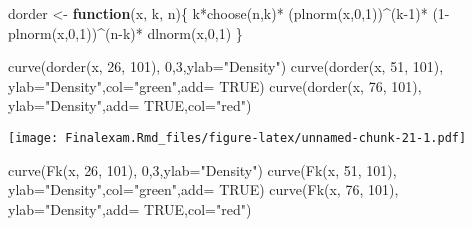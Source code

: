 \documentclass[
]{article}
\newenvironment{Shaded}{\begin{snugshade}}{\end{snugshade}}
\newcommand{\AttributeTok}[1]{\textcolor[rgb]{0.77,0.63,0.00}{#1}}
\newcommand{\ConstantTok}[1]{\textcolor[rgb]{0.00,0.00,0.00}{#1}}
\newcommand{\ControlFlowTok}[1]{\textcolor[rgb]{0.13,0.29,0.53}{\textbf{#1}}}
\newcommand{\DecValTok}[1]{\textcolor[rgb]{0.00,0.00,0.81}{#1}}
\newcommand{\FunctionTok}[1]{\textcolor[rgb]{0.00,0.00,0.00}{#1}}
\newcommand{\NormalTok}[1]{#1}
\newcommand{\OtherTok}[1]{\textcolor[rgb]{0.56,0.35,0.01}{#1}}
\newcommand{\SpecialCharTok}[1]{\textcolor[rgb]{0.00,0.00,0.00}{#1}}
\newcommand{\StringTok}[1]{\textcolor[rgb]{0.31,0.60,0.02}{#1}}
\begin{document}
\begin{Shaded}
\begin{Highlighting}[]
\NormalTok{dorder }\OtherTok{\textless{}{-}} \ControlFlowTok{function}\NormalTok{(x, k, n)\{}
\NormalTok{  k}\SpecialCharTok{*}\FunctionTok{choose}\NormalTok{(n,k)}\SpecialCharTok{*}
\NormalTok{    (}\FunctionTok{plnorm}\NormalTok{(x,}\DecValTok{0}\NormalTok{,}\DecValTok{1}\NormalTok{))}\SpecialCharTok{\^{}}\NormalTok{(k}\DecValTok{{-}1}\NormalTok{)}\SpecialCharTok{*}
\NormalTok{    (}\DecValTok{1}\SpecialCharTok{{-}}\FunctionTok{plnorm}\NormalTok{(x,}\DecValTok{0}\NormalTok{,}\DecValTok{1}\NormalTok{))}\SpecialCharTok{\^{}}\NormalTok{(n}\SpecialCharTok{{-}}\NormalTok{k)}\SpecialCharTok{*}
    \FunctionTok{dlnorm}\NormalTok{(x,}\DecValTok{0}\NormalTok{,}\DecValTok{1}\NormalTok{)}
\NormalTok{\}}

\FunctionTok{curve}\NormalTok{(}\FunctionTok{dorder}\NormalTok{(x, }\DecValTok{26}\NormalTok{, }\DecValTok{101}\NormalTok{), }\DecValTok{0}\NormalTok{,}\DecValTok{3}\NormalTok{,}\AttributeTok{ylab=}\StringTok{"Density"}\NormalTok{)}
\FunctionTok{curve}\NormalTok{(}\FunctionTok{dorder}\NormalTok{(x, }\DecValTok{51}\NormalTok{, }\DecValTok{101}\NormalTok{), }\AttributeTok{ylab=}\StringTok{"Density"}\NormalTok{,}\AttributeTok{col=}\StringTok{"green"}\NormalTok{,}\AttributeTok{add=} \ConstantTok{TRUE}\NormalTok{)}
\FunctionTok{curve}\NormalTok{(}\FunctionTok{dorder}\NormalTok{(x, }\DecValTok{76}\NormalTok{, }\DecValTok{101}\NormalTok{), }\AttributeTok{ylab=}\StringTok{"Density"}\NormalTok{,}\AttributeTok{add=} \ConstantTok{TRUE}\NormalTok{,}\AttributeTok{col=}\StringTok{"red"}\NormalTok{)}
\end{Highlighting}
\end{Shaded}

\texttt{[image: Finalexam.Rmd\_files/figure-latex/unnamed-chunk-21-1.pdf]}

\begin{Shaded}
\begin{Highlighting}[]
\FunctionTok{curve}\NormalTok{(}\FunctionTok{Fk}\NormalTok{(x, }\DecValTok{26}\NormalTok{, }\DecValTok{101}\NormalTok{), }\DecValTok{0}\NormalTok{,}\DecValTok{3}\NormalTok{,}\AttributeTok{ylab=}\StringTok{"Density"}\NormalTok{)}
\FunctionTok{curve}\NormalTok{(}\FunctionTok{Fk}\NormalTok{(x, }\DecValTok{51}\NormalTok{, }\DecValTok{101}\NormalTok{), }\AttributeTok{ylab=}\StringTok{"Density"}\NormalTok{,}\AttributeTok{col=}\StringTok{"green"}\NormalTok{,}\AttributeTok{add=} \ConstantTok{TRUE}\NormalTok{)}
\FunctionTok{curve}\NormalTok{(}\FunctionTok{Fk}\NormalTok{(x, }\DecValTok{76}\NormalTok{, }\DecValTok{101}\NormalTok{), }\AttributeTok{ylab=}\StringTok{"Density"}\NormalTok{,}\AttributeTok{add=} \ConstantTok{TRUE}\NormalTok{,}\AttributeTok{col=}\StringTok{"red"}\NormalTok{)}
\end{Highlighting}
\end{Shaded}
\end{document}
